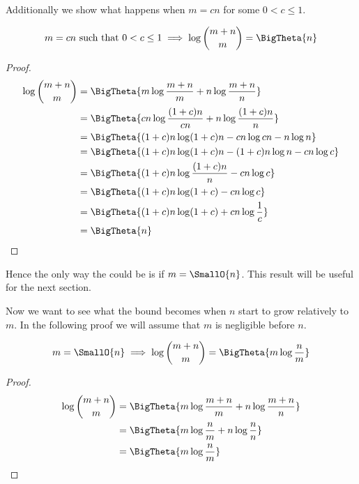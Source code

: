Additionally we show what happens when \(m = c n\) for some \(0 < c \le 1\).

\begin{lemma}
\begin{align*}
m = c n \text{ such that } 0 < c \le 1 &\implies \log\binom{m+n}{m} = \BigTheta{n}\\
\end{align*}
\end{lemma}

\begin{proof}
\begin{align*}
\log\binom{m+n}{m} &= \BigTheta{m \log\frac{m+n}{m} + n \log\frac{m+n}{n}}\\
&= \BigTheta{cn \log\frac{(1+c)n}{cn} + n \log\frac{(1+c)n}{n}}\\
&= \BigTheta{(1+c)n \log (1+c)n - cn \log cn - n \log n}\\
&= \BigTheta{(1+c)n \log (1+c)n - (1+c)n \log n - cn \log c}\\
&= \BigTheta{(1+c)n \log \frac{(1+c)n}{n} - cn \log c}\\
&= \BigTheta{(1+c)n \log (1+c) - cn \log c}\\
&= \BigTheta{(1+c)n \log (1+c) + cn \log \frac{1}{c}}\\
&= \BigTheta{n}\\
\end{align*}
\end{proof}

Hence the only way the  could be  is if \(m =
\SmallO{n}\). This result will be useful for the next section.

Now we want to see what the bound becomes when $n$ start to grow relatively to
$m$. In the following proof we will assume that $m$ is negligible before $n$.

\begin{lemma}
\begin{align*}
m = \SmallO{n} &\implies \log\binom{m+n}{m} = \BigTheta{m \log\frac{n}{m}}\\
\end{align*}
\end{lemma}

\begin{proof}
\begin{align*}
\log\binom{m+n}{m} &= \BigTheta{m \log\frac{m+n}{m} + n \log\frac{m+n}{n}}\\
&= \BigTheta{m \log\frac{n}{m} + n \log\frac{n}{n}}\\
&= \BigTheta{m \log\frac{n}{m}}\\
\end{align*}
\end{proof}


